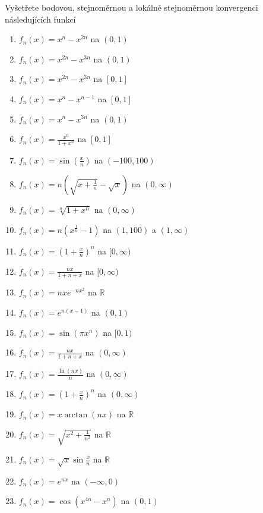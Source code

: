 \begin{multicols}{2}

Vyšetřete bodovou, stejnoměrnou a lokálně stejnoměrnou konvergenci následujících funkcí
\begin{enumerate}
\item $f_n(x) = x^n - x^{2n}$ na $(0,1)$
\item $f_n(x) = x^{2n} - x^{3n}$ na $(0,1)$
\item $f_n(x) = x^{2n}- x^{3n}$ na $[0,1]$
\item $f_n(x) = x^{n}- x^{n-1}$ na $[0,1]$
\item $f_n(x) = x^n - x^{3n}$ na $(0,1)$
\item $f_n(x) = \frac{x^n}{1+x^n}$ na $[0,1]$
\item $f_n(x) = \sin \left( \frac{x}{n} \right)$ na $(-100,100)$
\item $f_n(x) = n \left( \sqrt{x + \frac{1}{n}} - \sqrt{x} \right)$ na $(0,\infty)$
\item $f_n(x) = \sqrt[n]{1+x^n}$ na $(0,\infty)$
\item $f_n(x) = n \left( x^\frac{1}{n} - 1 \right)$ na $(1,100)$ a $(1,\infty)$
\item $f_n(x) = \left( 1 + \frac{x}{n} \right)^n$ na $[0,\infty)$
\item $f_n(x) = \frac{nx}{1+n+x}$ na $[0,\infty)$
\item $f_n(x) = nxe^{-nx^2}$ na $\mathbb{R}$
\item $f_n(x) = e^{n (x-1)}$ na $(0,1)$
\item $f_n(x) = \sin (\pi x^n)$ na $[0,1)$
\item $f_n(x) = \frac{nx}{1+n+x}$ na $(0,\infty)$
\item $f_n(x) = \frac{\ln (nx)}{n}$ na $(0,\infty)$
\item $f_n(x) = \left( 1 + \frac{x}{n} \right)^n$ na $(0,\infty)$
\item $f_n(x) = x \arctan (nx)$ na $\mathbb{R}$
\item $f_n(x) = \sqrt{x^2 + \frac{1}{n^2}}$ na $\mathbb{R}$
\item $f_n(x) = \sqrt{x} \sin \frac{x}{n}$ na $\mathbb{R}$
\item $f_n(x) = e^{nx}$ na $(-\infty, 0)$
\item $f_n(x) = \cos \left( x^{4n} - x^{n} \right)$ na $(0,1)$
\end{enumerate}

\separator


\end{multicols}
